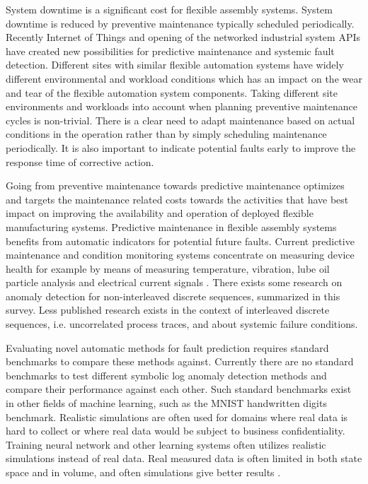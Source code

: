 \documentclass[journal]{IEEEtran}
\begin{document}
System downtime is a significant cost for flexible assembly systems. System downtime is reduced by preventive maintenance typically scheduled periodically.
Recently Internet of Things and opening of the networked industrial system APIs have created new possibilities for predictive maintenance and systemic fault detection. Different sites with similar
flexible automation systems have widely different environmental and workload conditions which has an impact on the wear and tear of the flexible automation system components.
Taking different site environments and workloads into account when planning preventive maintenance cycles is non-trivial. There is a clear need to adapt maintenance based on actual
conditions in the operation rather than by simply scheduling maintenance periodically\cite{hashemian2011state}.
It is also important to indicate potential faults early to improve the response time of corrective action.

Going from preventive maintenance towards predictive maintenance optimizes and targets the maintenance related costs towards the activities that have best impact
on improving the availability and operation of deployed flexible manufacturing systems.
Predictive maintenance in flexible assembly systems benefits from automatic indicators for potential future faults.
Current predictive maintenance and condition monitoring systems concentrate on measuring device health for example by means of measuring temperature\cite{mobley2002introduction},
vibration\cite{scheffer2004practical}, lube oil particle analysis\cite{hunt1993handbook} and electrical current signals
\cite{thomson2001current}. There exists some research on anomaly detection for non-interleaved discrete sequences, summarized in this survey\cite{chandola2012anomaly}.
Less published research exists in the context of interleaved discrete sequences, i.e. uncorrelated process traces, and about systemic failure conditions.

Evaluating novel automatic methods for fault prediction requires standard benchmarks to compare these methods against. Currently there are no standard benchmarks to test
different symbolic log anomaly detection methods and compare their performance against each other. Such standard benchmarks exist in other fields of machine learning,
such as the MNIST handwritten digits benchmark\cite{lecun-mnisthandwrittendigit-2010}. Realistic simulations are often used\cite{jager2014assessing} for domains where
real data is hard to collect or where real data would be subject to business confidentiality. Training neural network and other learning systems often utilizes realistic
simulations instead of real data\cite{weston2014memory}. Real measured data is often limited in both state space and in volume,
and often simulations give better results \cite{duch2005artificial}.
\end{document}
